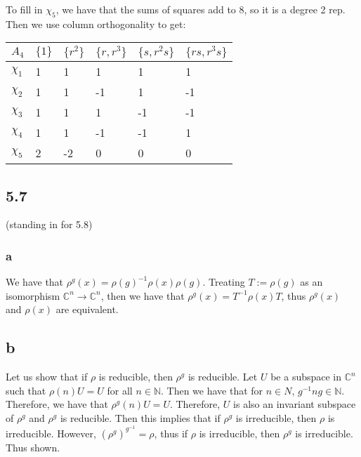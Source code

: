 \documentclass[]{article}
\begin{document}
To fill in $\chi_5$, we have that the sums of squares add to 8, so it is a degree 2 rep. Then we use column orthogonality to get:

\begin{table}[h!]
	\centering
	\begin{tabular}{|l|l|l|l|l|l|}
		\hline
		$A_4$    & $\{ 1 \} $ & $\{ r^2 \}$ & $ \{ r, r^3 \}$ & $\{ s, r^2 s \}$ & $\{ rs, r^3 s\}$ \\ \hline
		$\chi_1$ & 1          & 1           & 1               & 1                & 1                \\ \hline
		$\chi_2$ & 1          & 1           & -1              & 1                & -1               \\ \hline
		$\chi_3$ & 1          & 1           & 1               & -1               & -1               \\ \hline
		$\chi_4$ & 1          & 1           & -1              & -1               & 1                \\ \hline
		$\chi_5$ & 2          & -2           & 0               & 0                & 0                \\ \hline
	\end{tabular}
\end{table}

\subsection*{5.7} (standing in for 5.8)

\subsubsection*{a}
We have that $\rho^g(x) = \rho(g)^{-1} \rho(x) \rho(g)$. Treating $T := \rho(g)$ as an isomorphism $\mathbb{C}^n \rightarrow \mathbb{C}^n$, then we have that $\rho^g(x) = T^{-1} \rho(x) T$, thus $\rho^g(x)$ and $\rho(x)$ are equivalent. 

\subsection*{b}
Let us show that if $\rho$ is reducible, then $\rho^g$ is reducible. Let $U$ be a subspace in $\mathbb{C}^n$ such that $\rho(n) U = U$ for all $n \in \mathbb{N}$. Then we have that for $n \in N$, $g^{-1} n g \in \mathbb{N}$. Therefore, we have that $\rho^g(n) U = U$. Therefore, $U$ is also an invariant subspace of $\rho^g$ and $\rho^g$ is reducible. Then this implies that if $\rho^g$ is irreducible, then $\rho$ is irreducible. However, $\left(\rho^g\right)^{g^{-1}} = \rho$, thus if $\rho$ is irreducible, then $\rho^g$ is irreducible. Thus shown. 
\end{document}
